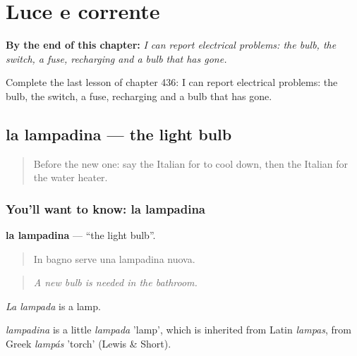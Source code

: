 
\chapter{Luce e corrente}
\label{ch:it-luce-e-corrente}

\begin{chapteropening}
\textbf{By the end of this chapter:} \emph{I can report electrical problems: the bulb, the switch, a fuse, recharging and a bulb that has gone.}

Complete the last lesson of chapter 436: I can report electrical problems: the bulb, the switch, a fuse, recharging and a bulb that has gone.
\end{chapteropening}

\section[la lampadina]{la lampadina — the light bulb}

\label{lesson:IT-C436-lampadina}



\begin{quote}
Before the new one: say the Italian for to cool down, then the Italian for the water heater.
\end{quote}

\subsection*{You'll want to know: la lampadina}
\textbf{la lampadina} — \textquotedblleft{}the light bulb\textquotedblright{}.

\begin{quote}
In bagno serve una lampadina nuova.
\end{quote}

\begin{quote}
\emph{A new bulb is needed in the bathroom.}
\end{quote}

\emph{La lampada} is a lamp.

\begin{cousinweb}
\emph{lampadina} is a little \emph{lampada} 'lamp', which is inherited from Latin \emph{lampas}, from Greek \emph{lampás} 'torch' (Lewis \& Short).
\end{cousinweb}

